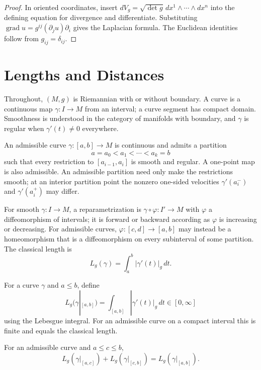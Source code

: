 \begin{proof}
\sketch In oriented coordinates, insert
$dV_g=\sqrt{\det g}\,dx^1\wedge\cdots\wedge dx^n$ into the defining equation
for divergence and differentiate. Substituting
$\operatorname{grad}u=g^{ij}(\partial_j u)\partial_i$ gives the Laplacian
formula. The Euclidean identities follow from $g_{ij}=\delta_{ij}$.
\end{proof}
\section{Lengths and Distances}

Throughout, $(M,g)$ is Riemannian with or without boundary. A curve is a continuous map $\gamma:I\to M$ from an interval; a curve segment has compact domain. Smoothness is understood in the category of manifolds with boundary, and $\gamma$ is regular when $\gamma'(t)\ne0$ everywhere.

An admissible curve $\gamma:[a,b]\to M$ is continuous and admits a partition
\[
a=a_0<a_1<\cdots<a_k=b
\]
such that every restriction to $[a_{i-1},a_i]$ is smooth and regular. A one-point map is also admissible. An admissible partition need only make the restrictions smooth; at an interior partition point the nonzero one-sided velocities $\gamma'(a_i^-)$ and $\gamma'(a_i^+)$ may differ.

For smooth $\gamma:I\to M$, a reparametrization is $\gamma\circ\varphi:I'\to M$ with $\varphi$ a diffeomorphism of intervals; it is forward or backward according as $\varphi$ is increasing or decreasing. For admissible curves, $\varphi:[c,d]\to[a,b]$ may instead be a homeomorphism that is a diffeomorphism on every subinterval of some partition. The classical length is
\[
L_g(\gamma)=\int_a^b|\gamma'(t)|_g\,dt.
\]

\begin{definition}
\label{def:length-of-curve}




For a curve $\gamma$ and $a\le b$, define
\[
L_g(\gamma|_{[a,b]})=\int_{[a,b]}|\gamma'(t)|_g\,dt\in[0,\infty]
\]
using the Lebesgue integral. For an admissible curve on a compact interval this is finite and equals the classical length.
\end{definition}

\begin{proposition}
\label{prop:length-additive}




For an admissible curve and $a\le c\le b$,
\[
L_g(\gamma|_{[a,c]})+L_g(\gamma|_{[c,b]})=L_g(\gamma|_{[a,b]}).
\]
\end{proposition}

